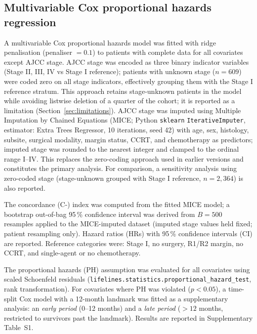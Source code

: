 \documentclass[12pt,a4paper]{article}
\begin{document}
\subsection{Multivariable Cox proportional hazards regression}
\label{sec:cox}
A multivariable Cox proportional hazards model was fitted with ridge
penalisation (penaliser $= 0.1$) to patients with complete data for all
covariates except AJCC stage. AJCC stage was encoded as three binary
indicator variables (Stage II, III, IV vs Stage I reference); patients
with unknown stage ($n = 609$) were coded zero on all stage indicators,
effectively grouping them with the Stage I reference stratum. This
approach retains stage-unknown patients in the model while avoiding
listwise deletion of a quarter of the cohort; it is reported as a
limitation (Section~\ref{sec:limitations}). AJCC stage was imputed using Multiple Imputation by Chained Equations
(MICE; Python \texttt{sklearn} \texttt{IterativeImputer}, estimator:
Extra Trees Regressor, 10 iterations, seed 42) with age, sex, histology,
subsite, surgical modality, margin status, CCRT, and chemotherapy as
predictors; imputed stage was rounded to the nearest integer and clamped
to the ordinal range I--IV. This replaces the zero-coding approach used
in earlier versions and constitutes the primary analysis. For comparison,
a sensitivity analysis using zero-coded stage (stage-unknown grouped with
Stage I reference, $n = 2{,}364$) is also reported.

The concordance (C-) index was computed from the fitted MICE model; a
bootstrap out-of-bag 95\,\% confidence interval was derived from $B =
500$ resamples applied to the MICE-imputed dataset (imputed stage values
held fixed; patient resampling only). Hazard ratios (HRs) with 95\,\%
confidence intervals (CI) are reported. Reference categories were:
Stage I, no surgery, R1/R2 margin, no CCRT, and single-agent or no
chemotherapy.

The proportional hazards (PH) assumption was evaluated for all covariates
using scaled Schoenfeld residuals (\texttt{lifelines.statistics.proportional\_hazard\_test},
rank transformation). For covariates where PH was violated ($p < 0.05$), a
time-split Cox model with a 12-month landmark was fitted as a supplementary
analysis: an \textit{early period} (0--12 months) and a \textit{late period}
($> 12$ months, restricted to survivors past the landmark). Results are
reported in Supplementary Table~S1.
\end{document}
